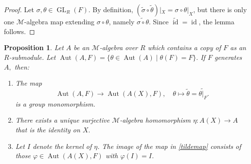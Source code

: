\documentclass{article}
\newtheorem{prop}[thm]{Proposition}
\theoremstyle{definition}
\def\id{\ensuremath{\operatorname{id}}}
\def\Aut{\ensuremath{\operatorname{Aut}}}
\def\BAut{\ensuremath{\operatorname{\mathbf{Aut}}}}
\def\GL{\ensuremath{\operatorname{GL}}}
\def\Mu{\ensuremath{\mathcal{M}}}
\begin{document}
\begin{proof}
	Let $\sigma, \theta \in \GL_R(F)$. By definition, $(\widetilde \sigma \circ \widetilde \theta)|_X = \sigma \circ \theta |_X$, but there is only one $\Mu$-algebra map extending $\sigma \circ \theta$, namely $\widetilde{\sigma \circ \theta}$.
	Since $\widetilde{\id} = \id$,  the lemma follows. 
\end{proof}

 
\begin{prop}\label{prop2} Let $A$ be an $\Mu$-algebra over $R$ which contains a copy of $F$ as an $R$-submodule. Let $\Aut(A,F) = \{ \theta \in \Aut(A) \mid \theta(F) = F\}.$ If  $F$ generates $A,$ then:

\begin{enumerate}[label = (\roman*)]
	\item \label{p2i} The map 
\begin{equation}\label{tildemap} \Aut(A,F) \to \Aut(A(X), F), \quad \theta \mapsto \widetilde \theta = \widetilde{\theta|_F}. \end{equation}
is a group monomorphism.

\item \label{p2ii}  There exists a unique surjective $\Mu$-algebra homomorphism $\eta\colon A(X) \to A$ that is the identity on $X.$ 

\item \label{p2iii} Let $I$ denote the kernel of $\eta$. The image of the map in \eqref{tildemap} consists of those $\varphi \in \Aut(A(X),F)$ with $\varphi(I) = I$.
\end{enumerate}
\end{prop}
\end{document}
